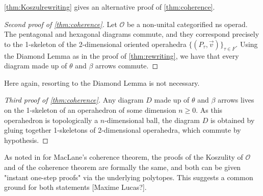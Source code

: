 \documentclass[10pt]{amsart}
\theoremstyle{definition}
\theoremstyle{remark}
\numberwithin{equation}{section}
\newcommand{\0}{\color{blue}{\mathsf{0}}}
\begin{document}
\medskip

\cref{thm:Koszulrewriting} gives an alternative proof of \cref{thm:coherence}. 

\begin{proof}[Second proof of {\cref{thm:coherence}}] Let $\mathcal{O}$ be a non-unital categorified ns operad. The pentagonal and hexagonal diagrams commute, and they correspond precisely to the 1-skeleton of the 2-dimensional oriented operahedra $\{(P_\tau,\vec v)\}_{\tau \in F}$. Using the Diamond Lemma as in the proof of \cref{thm:rewriting}, we have that every diagram made up of $\theta$ and $\beta$ arrows commute. 
\end{proof}

Here again, resorting to the Diamond Lemma is not necessary.

\begin{proof}[Third proof of {\cref{thm:coherence}}] Any diagram $D$ made up of $\theta$ and $\beta$ arrows lives on the 1-skeleton of an operahedron of some dimension $n\geq 0$. As this operahedron is topologically a $n$-dimensional ball, the diagram $D$ is obtained by gluing together 1-skeletons of 2-dimensional operahedra, which commute by hypothesis.
\end{proof}

As noted in \cite[Remark p.266]{LodayVallette12} for MacLane's coherence theorem, the proofs of the Koszulity of $\mathcal{O}$ and of the coherence theorem are formally the same, and both can be given "instant one-step proofs" via the underlying polytopes. This suggests a common ground for both statements [Maxime Lucas?].
  






\end{document}
